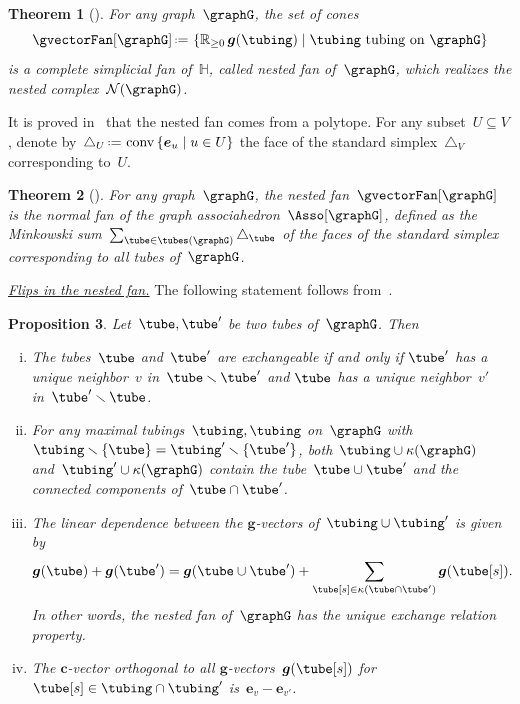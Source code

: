 \documentclass{amsart}
\newtheorem{theorem}{Theorem}[section]
\newtheorem{proposition}[theorem]{Proposition}
\theoremstyle{definition}
\newcommand{\R}{\mathbb{R}} %
\newcommand{\HH}{\mathbb{H}} %
\renewcommand{\b}[1]{{\boldsymbol{#1}}} %
\newcommand{\set}[2]{\left\{ #1 \;\middle|\; #2 \right\}} %
\newcommand{\ssm}{\smallsetminus} %
\newcommand{\eqdef}{\mbox{\,\raisebox{0.2ex}{\scriptsize\ensuremath{\mathrm:}}\ensuremath{=}\,}} %
\DeclareMathOperator{\conv}{conv} %
\newcommand{\darkblue}{\color{darkblue}} %
\newcommand{\defn}[1]{\textsl{\darkblue #1}} %
\newcommand{\para}[1]{\medskip\noindent\uline{\textit{#1.}}} %
\newcommand{\gvector}[1]{\b{g}(#1)} %
\newcommand{\gvectors}[1]{\b{g}(#1)} %
\newcommand{\ground}{V} %
\newcommand{\connectedComponents}{\kappa} %
\newcommand{\nestedComplex}{\mathcal{N}} %
\begin{document}
\begin{theorem}[\cite{CarrDevadoss, Postnikov, FeichtnerSturmfels, Zelevinsky}]
For any graph~$\graphG$, the set of cones
\[
\gvectorFan[\graphG] \eqdef \set{\R_{\ge 0} \, \gvectors{\tubing}}{\tubing \text{ tubing on } \graphG}
\]
is a complete simplicial fan of~$\HH$, called \defn{nested fan} of~$\graphG$, which realizes the nested complex~$\nestedComplex(\graphG)$.
\end{theorem}

It is proved in~\cite{CarrDevadoss, Devadoss, Postnikov, FeichtnerSturmfels, Zelevinsky} that the nested fan comes from a polytope.
For any subset~$U \subseteq \ground$, denote by~$\triangle_U \eqdef \conv\set{\b{e}_u}{u \in U}$ the face of the standard simplex~$\triangle_\ground$ corresponding to~$U$.

\begin{theorem}[\cite{CarrDevadoss, Devadoss, Postnikov, FeichtnerSturmfels, Zelevinsky}]
For any graph~$\graphG$, the nested fan~$\gvectorFan[\graphG]$ is the normal fan of the graph associahedron~$\Asso[\graphG]$, defined as the Minkowski sum~$\sum_{\tube \in \tubes(\graphG)} \triangle_{\tube}$ of the faces of the standard simplex corresponding to all tubes of~$\graphG$.
\end{theorem}

\para{Flips in the nested fan}
%
The following statement follows from~\cite{MannevillePilaud-compatibilityFans, Zelevinsky}.

\begin{proposition}
\label{prop:exchangeablePairsGA}
Let~$\tube, \tube'$ be two tubes of~$\graphG$. Then
\begin{enumerate}[(i)]
\item The tubes~$\tube$ and~$\tube'$ are exchangeable if and only if $\tube'$ has a unique neighbor~$v$ in~$\tube \ssm \tube'$ and $\tube$ has a unique neighbor~$v'$ in~$\tube' \ssm \tube$.
\item For any maximal tubings~$\tubing, \tubing$ on~$\graphG$ with $\tubing \ssm \{\tube\} = \tubing' \ssm \{\tube'\}$, both~$\tubing \cup \connectedComponents(\graphG)$ and~$\tubing' \cup \connectedComponents(\graphG)$ contain the tube~$\tube \cup \tube'$ and the connected components of~$\tube \cap \tube'$.
\item The linear dependence between the $\b{g}$-vectors of~$\tubing \cup \tubing'$ is given by
\[
\gvector{\tube} + \gvector{\tube'} = \gvector{\tube \cup \tube'} + \sum_{\tube[s] \in \connectedComponents(\tube \cap \tube')} \gvector{\tube[s]}.
\]
In other words, the nested fan of~$\graphG$ has the unique exchange relation property.
\item The $\b{c}$-vector orthogonal to all $\b{g}$-vectors~$\gvector{\tube[s]}$ for~$\tube[s] \in \tubing \cap \tubing'$ is~$\b{e}_v - \b{e}_{v'}$.
\end{enumerate}
\end{proposition}
\end{document}
